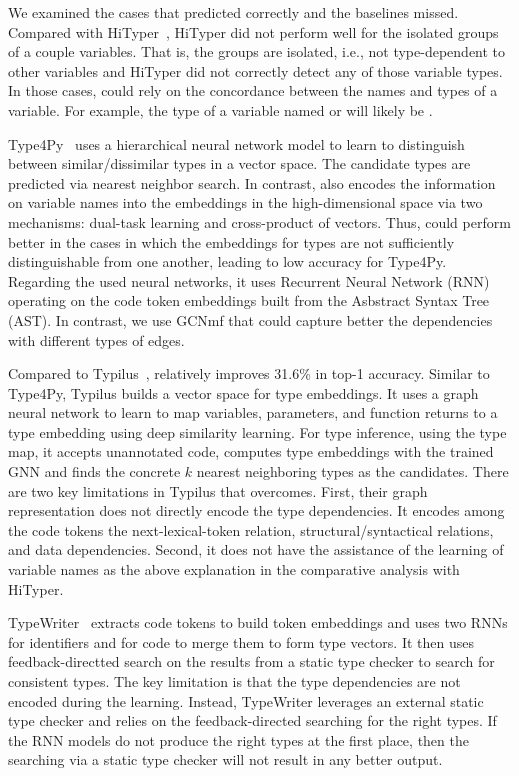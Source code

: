 We examined the cases that {\tool} predicted correctly and the
baselines missed. Compared with HiTyper~\cite{HiTyper-icse22}, HiTyper
did not perform well for the isolated groups of a couple
variables. That is, the groups are isolated, i.e., not type-dependent
to other variables and HiTyper did not correctly detect any of those
variable types. In those cases, {\tool} could rely on the concordance
between the names and types of a variable. For example, the type of a
variable named  or  will likely be .

Type4Py~\cite{Type4Py-icse22} uses a hierarchical neural network model
to learn to distinguish between similar/dissimilar types in a vector
space. The candidate types are predicted via nearest neighbor search.
In contrast, {\tool} also encodes the information on variable names
into the embeddings in the high-dimensional space via two mechanisms:
dual-task learning and cross-product of vectors. Thus, {\tool} could
perform better in the cases in which the embeddings for types are not
sufficiently distinguishable from one another, leading to low accuracy
for Type4Py. Regarding the used neural networks, it uses Recurrent
Neural Network (RNN) operating on the code token embeddings built from
the Asbstract Syntax Tree (AST). In contrast, we use GCNmf that could
capture better the dependencies with different types of edges.

Compared to Typilus~\cite{typilus-pldi20}, {\tool} relatively improves
31.6\% in top-1 accuracy. Similar to Type4Py, Typilus builds a vector
space for type embeddings. It uses a graph neural network to learn to
map variables, parameters, and function returns to a type embedding
using deep similarity learning. For type inference, using the type
map, it accepts unannotated code, computes type embeddings with the
trained GNN and finds the concrete $k$ nearest neighboring types as
the candidates. There are two key limitations in Typilus that {\tool}
overcomes. First, their graph representation does not directly encode
the type dependencies. It encodes among the code tokens the
next-lexical-token relation, structural/syntactical relations, and
data dependencies. Second, it does not have the assistance of the
learning of variable names as the above explanation in the comparative
analysis with HiTyper.

TypeWriter~\cite{typewriter-fse20} extracts code tokens to build token
embeddings and uses two RNNs for identifiers and for code to merge
them to form type vectors. It then uses feedback-directted search on
the results from a static type checker to search for consistent types.
The key limitation is that the type dependencies are not encoded
during the learning. Instead, TypeWriter leverages an external static
type checker and relies on the feedback-directed searching for the
right types. If the RNN models do not produce the right types at the
first place, then the searching via a static type checker will not
result in any better output.

